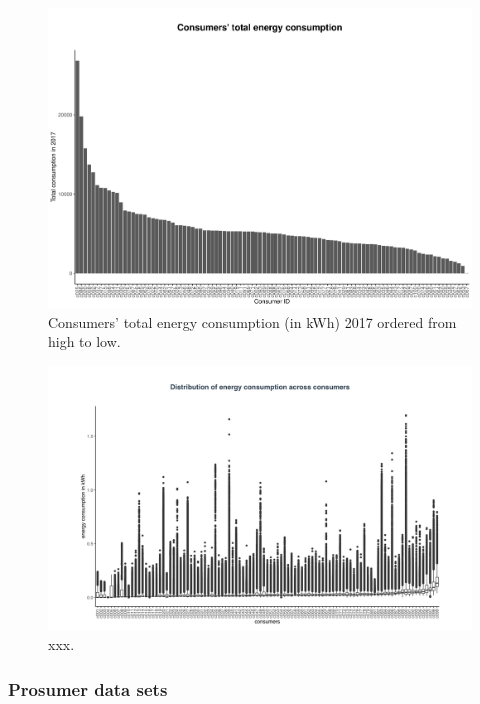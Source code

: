 \begin{figure}[h]
 \centering
\includegraphics[width=\textwidth]{thesis/graphs/consumer_total consumption.pdf}
\caption[xxx]{Consumers' total energy consumption (in kWh) 2017 ordered from high to low. \quantnet}
\label{Fig:total_consumption}
\end{figure}

\begin{figure}[h]
 \centering
\includegraphics[width=\textwidth]{thesis/graphs/consumer_boxplots.png}
\caption[xxx]{xxx. \quantnet}
\label{Fig:boxplots_consumption}
\end{figure}

\subsubsection{Prosumer data sets}

